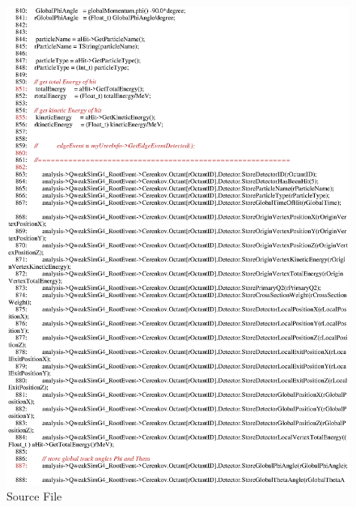 \clearpage

\begin{figure}[h]
  \hspace{0cm}
  \includegraphics[scale=0.8]{./figures13/QweakSimEventAction.cc-p15.eps}
  \caption{Source File}
           \label{fig:XIII-SC-30}
\end{figure}

\clearpage

